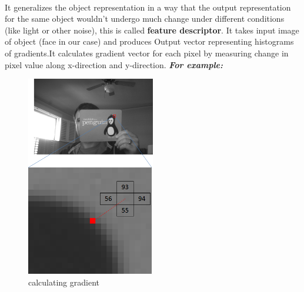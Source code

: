 \paragraph{}It generalizes the object representation in a way that the output representation for the same object wouldn’t undergo much change under different conditions (like light or other noise), this is called \textbf{feature descriptor}.
It takes input image of object (face in our case) and produces Output vector representing histograms of gradients.\newline It calculates gradient vector for each pixel by measuring change in pixel value along x-direction and y-direction. \newline \newline \textbf{\textit{For example:}}\newline
\begin{figure}
    \centering
	\includegraphics[width=0.5\textwidth]{images/hog_pixel_ex.png}
	\caption{calculating gradient}
	\label{fig:calculating gradient}
\end{figure}

